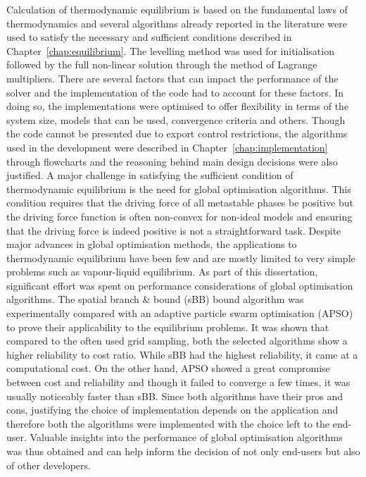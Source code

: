	Calculation of thermodynamic equilibrium is based on the fundamental laws of thermodynamics and several algorithms already reported in the literature were used to satisfy the necessary and sufficient conditions described in Chapter~\ref{chap:equilibrium}. The levelling method was used for initialisation followed by the full non-linear solution through the method of Lagrange multipliers. There are several factors that can impact the performance of the solver and the implementation of the code had to account for these factors. In doing so, the implementations were optimised to offer flexibility in terms of the system size, models that can be used, convergence criteria and others. Though the code cannot be presented due to export control restrictions, the algorithms used in the development were described in Chapter~\ref{chap:implementation} through flowcharts and the reasoning behind main design decisions were also justified. A major challenge in satisfying the sufficient condition of thermodynamic equilibrium is the need for global optimisation algorithms. This condition requires that the driving force of all metastable phases be positive but the driving force function is often non-convex for non-ideal models and ensuring that the driving force is indeed positive is not a straightforward task. Despite major advances in global optimisation methods, the applications to thermodynamic equilibrium have been few and are mostly limited to very simple problems such as vapour-liquid equilibrium. As part of this dissertation, significant effort was spent on performance considerations of global optimisation algorithms. The spatial branch \& bound (sBB) bound algorithm was experimentally compared with an adaptive particle swarm optimisation (APSO) to prove their applicability to the equilibrium problems. It was shown that compared to the often used grid sampling, both the selected algorithms show a higher reliability to cost ratio. While sBB had the highest reliability, it came at a computational cost. On the other hand, APSO showed a great compromise between cost and reliability and though it failed to converge a few times, it was usually noticeably faster than sBB. Since both algorithms have their pros and cons, justifying the choice of implementation depends on the application and therefore both the algorithms were implemented with the choice left to the end-user. Valuable insights into the performance of global optimisation algorithms was thus obtained and can help inform the decision of not only end-users but also of other developers.
	
